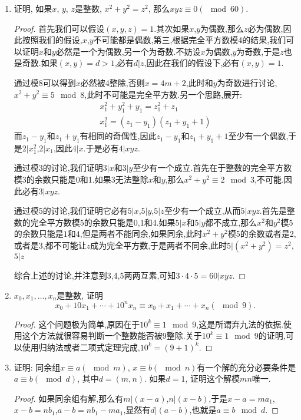 \documentclass[12pt,a4paper]{book} %
\theoremstyle{remark}
\theoremstyle{example}
\theoremstyle{lemma}
\theoremstyle{corollary}
\numberwithin{theorem}{chapter}
\begin{document}
\begin{enumerate}
\item 证明, 如果$x$, $y$, $z$是整数, $x^2 + y^2 = z^2$, 那么$xyz \equiv 0 (\mod 60)$.

\begin{proof}
首先我们可以假设$(x,y,z)=1$.其次如果$x$,$y$为偶数,那么$z$必为偶数,因此按照我们的假设,$x$,$y$不可能都是偶数,第三,根据完全平方数模4的结果,我们可以证明$x$和$y$必然是一个为偶数,另一个为奇数.不妨设$x$为偶数,$y$为奇数,于是$z$也是奇数.如果$(x,y)=d>1$,必有$d|z$,因此在我们的假设下,必有$(x,y)=1$.

通过模8可以得到$x$必然被4整除,否则$x=4m+2$,此时和$y$为奇数进行讨论,$x^2+y^2\equiv5\mod{8}$,此时不可能是完全平方数.另一个思路,展开:
\begin{gather*}
x_1^2 + y_1^2 + y_1=z_1^2+z_1 \\
x_1^2=(z_1-y_1)(z_1+y_1+1)
\end{gather*}
而$z_1-y_1$和$z_1+y_1$有相同的奇偶性,因此$z_1-y_1$和$z_1+y_1+1$至少有一个偶数,于是$2|x_1^2$,$2|x_1$,因此$4|x$.于是必有$4|xyz$.

通过模3的讨论,我们证明$3|x$和$3|y$至少有一个成立.首先在于整数的完全平方数模3的余数只能是0和1.如果3无法整除$x$和$y$,那么$x^2+y^2\equiv2\mod{3}$,不可能.因此必有$3|xyz$.

通过模5的讨论,我们证明它必有$5|x$,$5|y$,$5|z$至少有一个成立,从而$5|xyz$.首先是整数的完全平方数模5的余数只能是0,1和4.如果$5|x$和$5|y$都不成立,那么$x^2$和$y^2$模5的余数只能是$1$和$4$,但是两者不能同余,如果同余,此时$x^2+y^2$模5的余数或者是2,或者是3,都不可能让$z$成为完全平方数,于是两者不同余,此时$5|(x^2+y^2)=z^2$,$5|z$

综合上述的讨论,并注意到3,4,5两两互素,可知$3\cdot4\cdot5=60|xyz$.
\end{proof}

\item $x_0, x_1, \ldots, x_n$是整数, 证明
\[
x_0 + 10x_1 + \cdots + 10^nx_n \equiv x_0 + x_1 + \cdots + x_n (\mod 9).
\]

\begin{proof}
这个问题极为简单,原因在于$10^k \equiv 1 \mod{9}$,这是所谓弃九法的依据.使用这个方法就很容易判断一个整数能否被9整除.关于$10^k \equiv 1 \mod{9}$的证明,可以使用归纳法或者二项式定理完成,$10^k = (9 + 1)^k$.
\end{proof}

\item 证明: 同余组$x \equiv a (\mod m)$, $x \equiv b (\mod n)$有一个解的充分必要条件是$a \equiv b (\mod d)$, 其中$d = (m, n)$. 如果$d = 1$, 证明这个解模$mn$唯一.

\begin{proof}
如果同余组有解,那么有$m|(x-a)$,$n|(x-b)$,于是$x-a=ma_1$,$x-b=nb_1$,$a-b=nb_1-ma_1$,显然有$d|(a-b)$,也就是$a \equiv b \mod{d}$.


\end{proof}
\end{enumerate}
\end{document}

